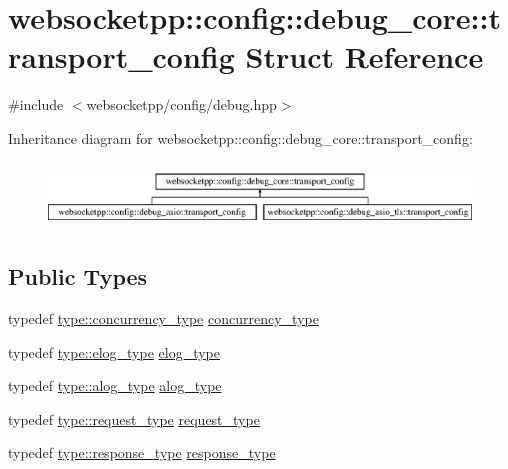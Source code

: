\hypertarget{structwebsocketpp_1_1config_1_1debug__core_1_1transport__config}{}\section{websocketpp\+:\+:config\+:\+:debug\+\_\+core\+:\+:transport\+\_\+config Struct Reference}
\label{structwebsocketpp_1_1config_1_1debug__core_1_1transport__config}


{\ttfamily \#include $<$websocketpp/config/debug.\+hpp$>$}

Inheritance diagram for websocketpp\+:\+:config\+:\+:debug\+\_\+core\+:\+:transport\+\_\+config\+:\begin{figure}[H]
\begin{center}
\leavevmode
\includegraphics[height=1.739130cm]{structwebsocketpp_1_1config_1_1debug__core_1_1transport__config}
\end{center}
\end{figure}
\subsection*{Public Types}
\begin{DoxyCompactItemize}
\item 
typedef \hyperlink{structwebsocketpp_1_1config_1_1debug__core_aada73b9183fc032c25178870dbb4d83d}{type\+::concurrency\+\_\+type} \hyperlink{structwebsocketpp_1_1config_1_1debug__core_1_1transport__config_a3dcd0e3cfc508d9a7e1c096735915f36}{concurrency\+\_\+type}
\item 
typedef \hyperlink{structwebsocketpp_1_1config_1_1debug__core_acfa1ded7f80d6a7276b0ec3fd0859fc3}{type\+::elog\+\_\+type} \hyperlink{structwebsocketpp_1_1config_1_1debug__core_1_1transport__config_a408656d4012b1b02d296bb9a7da84c49}{elog\+\_\+type}
\item 
typedef \hyperlink{structwebsocketpp_1_1config_1_1debug__core_a2e57e38001385110ce0fbbd17af6b0af}{type\+::alog\+\_\+type} \hyperlink{structwebsocketpp_1_1config_1_1debug__core_1_1transport__config_a400180c9d501bcdac92a42eee2e233e6}{alog\+\_\+type}
\item 
typedef \hyperlink{structwebsocketpp_1_1config_1_1debug__core_a597de872d5a5b6e9bd2fa1af18ccbbc6}{type\+::request\+\_\+type} \hyperlink{structwebsocketpp_1_1config_1_1debug__core_1_1transport__config_a39a4450305cfaa5c8211d3dff2a7c871}{request\+\_\+type}
\item 
typedef \hyperlink{structwebsocketpp_1_1config_1_1debug__core_aa11255cb23f43afb8884bc464aa5c572}{type\+::response\+\_\+type} \hyperlink{structwebsocketpp_1_1config_1_1debug__core_1_1transport__config_af3f1a34b5663166430b52e4dd1f1398a}{response\+\_\+type}
\end{DoxyCompactItemize}
